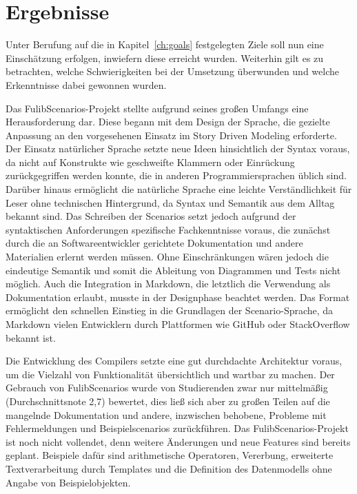\chapter{Ergebnisse}\label{ch:ergebnisse}

Unter Berufung auf die in Kapitel~\ref{ch:goals} festgelegten Ziele soll nun eine Einschätzung erfolgen, inwiefern diese erreicht wurden.
Weiterhin gilt es zu betrachten, welche Schwierigkeiten bei der Umsetzung überwunden und welche Erkenntnisse dabei gewonnen wurden.

Das FulibScenarios-Projekt stellte aufgrund seines großen Umfangs eine Herausforderung dar.
Diese begann mit dem Design der Sprache, die gezielte Anpassung an den vorgesehenen Einsatz im Story Driven Modeling erforderte.
Der Einsatz natürlicher Sprache setzte neue Ideen hinsichtlich der Syntax voraus, da nicht auf Konstrukte wie geschweifte Klammern oder Einrückung zurückgegriffen werden konnte, die in anderen Programmiersprachen üblich sind.
Darüber hinaus ermöglicht die natürliche Sprache eine leichte Verständlichkeit für Leser ohne technischen Hintergrund, da Syntax und Semantik aus dem Alltag bekannt sind.
Das Schreiben der Scenarios setzt jedoch aufgrund der syntaktischen Anforderungen spezifische Fachkenntnisse voraus, die zunächst durch die an Softwareentwickler gerichtete Dokumentation und andere Materialien erlernt werden müssen.
Ohne Einschränkungen wären jedoch die eindeutige Semantik und somit die Ableitung von Diagrammen und Tests nicht möglich.
Auch die Integration in Markdown, die letztlich die Verwendung als Dokumentation erlaubt, musste in der Designphase beachtet werden.
Das Format ermöglicht den schnellen Einstieg in die Grundlagen der Scenario-Sprache, da Markdown vielen Entwicklern durch Plattformen wie GitHub oder StackOverflow bekannt ist.

Die Entwicklung des Compilers setzte eine gut durchdachte Architektur voraus, um die Vielzahl von Funktionalität übersichtlich und wartbar zu machen.
Der Gebrauch von FulibScenarios wurde von Studierenden zwar nur mittelmäßig (Durchschnittsnote 2,7) bewertet, dies ließ sich aber zu großen Teilen auf die mangelnde Dokumentation und andere, inzwischen behobene, Probleme mit Fehlermeldungen und Beispielscenarios zurückführen.
Das FulibScenarios-Projekt ist noch nicht vollendet, denn weitere Änderungen und neue Features sind bereits geplant.
Beispiele dafür sind arithmetische Operatoren, Vererbung, erweiterte Textverarbeitung durch Templates und die Definition des Datenmodells ohne Angabe von Beispielobjekten.

